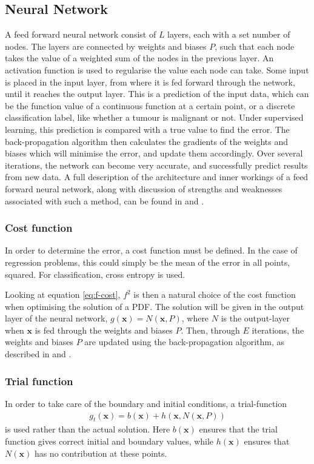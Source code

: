 \documentclass[multicolumn, 9pt]{extarticle}
\begin{document}
\subsection{Neural Network}
A feed forward neural network consist of $L$ layers, each with a set number of nodes. The layers are connected by weights and biases $P$, such that each node takes the value of a weighted sum of the nodes in the previous layer. An activation function is used to regularise the value each node can take. Some input is placed in the input layer, from where it is fed forward through the network, until it reaches the output layer. This is a prediction of the input data, which can be the function value of a continuous function at a certain point, or a discrete classification label, like whether a tumour is malignant or not. Under supervised learning, this prediction is compared with a true value to find the error. The back-propagation algorithm then calculates the gradients of the weights and biases which will minimise the error, and update them accordingly. Over several iterations, the network can become very accurate, and successfully predict results from new data. A full description of the architecture and inner workings of a feed forward neural network, along with discussion of strengths and weaknesses associated with such a method, can be found in \cite{p2S} and \cite{p2HO}.

\subsubsection{Cost function}
In order to determine the error, a cost function must be defined. In the case of regression problems, this could simply be the mean of the error in all points, squared. For classification, cross entropy is used.

Looking at equation \eqref{eq:f-cost}, $f^2$ is then a natural choice of the cost function when optimising the solution of a PDF. The solution will be given in the output layer of the neural network, $g(\mathbf{x}) = N(\mathbf{x}, P)$, where $N$ is the output-layer when $\mathbf{x}$ is fed through the weights and biases $P$.
Then, through $E$ iterations, the weights and biases $P$ are updated using the back-propagation algorithm, as described in \cite{p2S} and \cite{p2HO}.

\subsubsection{Trial function}\label{sec:trialf}
In order to take care of the boundary and initial conditions, a trial-function
\begin{align*}
	g_t(\mathbf{x}) = b(\mathbf{x}) + h(\mathbf{x}, N(\mathbf{x}, P))
\end{align*}
is used rather than the actual solution. Here $b(\mathbf{x})$ ensures that the trial function gives correct initial and boundary values, while $h(\mathbf{x})$ ensures that $N(\mathbf{x})$ has no contribution at these points.
\end{document}

